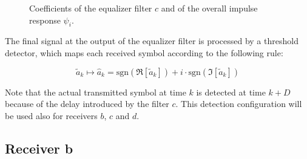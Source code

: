 \documentclass[a4paper, 12pt]{report}
\begin{document}
\begin{figure}[H]
	\centering
	\caption{Coefficients of the equalizer filter $c$ and of the overall impulse response $\psi_i$.}\label{filters_a}
\end{figure}

The final signal at the output of the equalizer filter is processed by a threshold detector, which maps each received symbol according to the following rule:

\begin{equation*}
\tilde{a}_k \mapsto \hat{a}_k = \text{sgn}(\Re[\tilde{a}_k ]) +i \cdot \text{sgn}(\Im[\tilde{a}_k ])
\end{equation*}
 
Note that the actual transmitted symbol at time $k$ is detected at time $k+D$ because of the delay introduced by the filter $c$. This detection configuration will be used also for receivers $b$, $c$ and $d$. 

\clearpage

\subsection*{Receiver b}
\end{document}
